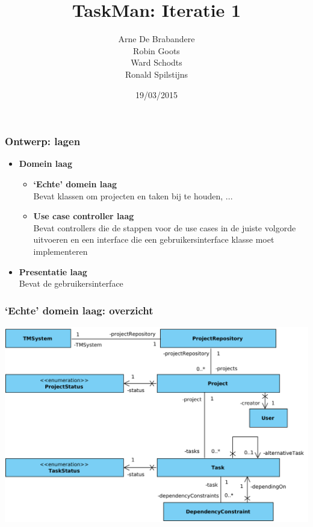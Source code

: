 \documentclass[11pt]{beamer}
\author{Arne De Brabandere\\Robin Goots\\Ward Schodts\\Ronald Spilstijns}
\title{TaskMan: Iteratie 1}
\institute{K.U. Leuven}
\date{19/03/2015}
\begin{document}
\begin{frame}
\titlepage
\end{frame}



\begin{frame}
\frametitle{Ontwerp: lagen}
\begin{itemize}
\item \textbf{Domein laag}
\begin{itemize}
	\item \textbf{`Echte' domein laag}\\Bevat klassen om projecten en taken bij te houden, ...
	\item \textbf{Use case controller laag}\\Bevat controllers die de stappen voor de use cases in de juiste volgorde uitvoeren en een interface die een gebruikersinterface klasse moet implementeren
\end{itemize}
\item \textbf{Presentatie laag}
\\Bevat de gebruikersinterface
\end{itemize}
\end{frame}


\begin{frame}
\frametitle{`Echte' domein laag: overzicht}
\begin{center}
\includegraphics[width=\textwidth,height=0.8\textheight,keepaspectratio]{uml/proper_domain_overview.png}
\end{center}
\end{frame}
\end{document}

